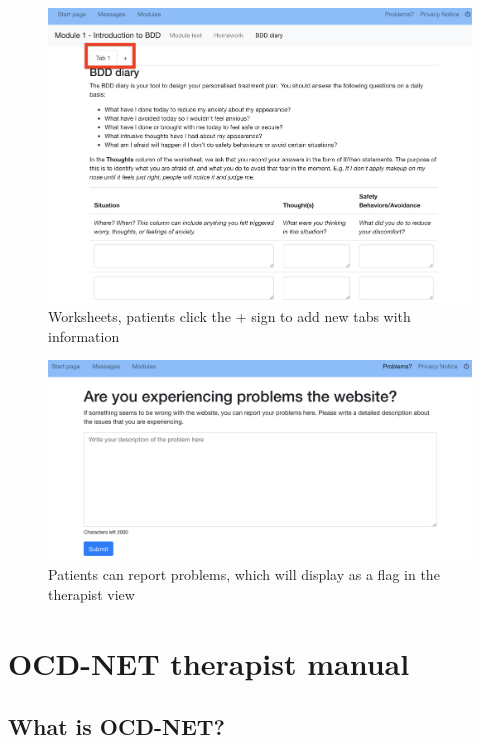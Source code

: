 \documentclass[]{book}
\begin{document}
\begin{figure}
\centering
\includegraphics{images/patient-worksheet.png}
\caption{Worksheets, patients click the + sign to add new tabs with information}
\end{figure}

\begin{figure}
\centering
\includegraphics{images/patient-problems.png}
\caption{Patients can report problems, which will display as a flag in the therapist view}
\end{figure}

\hypertarget{ocd-net-therapist-manual}{%
\chapter{OCD-NET therapist manual}\label{ocd-net-therapist-manual}}

\hypertarget{what-is-ocd-net}{%
\section{What is OCD-NET?}\label{what-is-ocd-net}}
\end{document}
